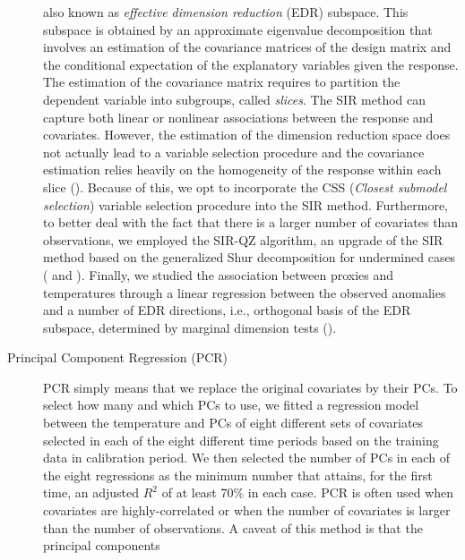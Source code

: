 \documentclass[11pt]{amsart}
\theoremstyle{plain}
\theoremstyle{definition}
\theoremstyle{remark}
\begin{document}
\begin{description}
  also known as \textit{effective dimension reduction} (EDR) subspace. 
  This subspace is obtained by an approximate eigenvalue decomposition that
  involves an estimation of the covariance matrices of the design matrix and
  the conditional expectation of the explanatory variables given the
  response. The
  estimation of the covariance matrix requires to partition the dependent variable into subgroups, called \textit{slices}.
  The SIR method can capture both linear or nonlinear associations between the response and
  covariates. However, the estimation of the dimension
  reduction space does not actually lead to a variable selection procedure and the
  covariance estimation relies heavily on the homogeneity of the response within
  each slice (\cite{Wu2010}). Because of this, we opt to incorporate the CSS
  (\textit{Closest submodel selection}) variable 
  selection procedure into the SIR method. Furthermore, to better deal with the fact that there is a larger number of
  covariates than observations, we employed the SIR-QZ algorithm, an upgrade of the SIR method based on the generalized Shur decomposition for undermined cases (\cite{Coudret2014} and \cite{Coudret2017}).   
  Finally, we studied the association between proxies and temperatures
  through a linear regression between the observed anomalies and a number of EDR directions, i.e., orthogonal basis of the EDR subspace, determined by marginal dimension tests (\cite{Cook2004}). 
\item[Principal Component Regression (PCR)]
PCR simply means that we replace the original covariates by their PCs. To select how many and which PCs to use, we fitted a regression model between the temperature and PCs of eight different sets of covariates selected in each of the eight different time periods based on the training data in calibration period. We then selected the number of PCs in each of
the eight regressions as the minimum number that attains, for the first time, an adjusted
$R^2$ of at least 70\% in each case. PCR is often used when covariates are
highly-correlated or when the number of covariates is larger than the number of 
 observations. A caveat of this method is that the principal components

\end{description}
\end{document}
